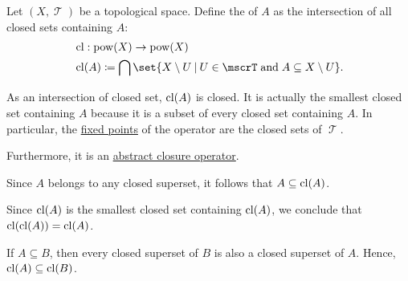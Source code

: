 \begin{definition}\label{def:topological_closure_operator}
  Let \( (X, \mscrT) \) be a topological space. Define the  of \( A \) as the intersection of all closed sets containing \( A \):
  \begin{equation*}
    \begin{aligned}
      &\cl: \pow(X) \to \pow(X) \\
      &\cl(A) \coloneqq \bigcap \set{ X \setminus U \given U \in \mscrT \T{and} A \subseteq X \setminus U }.
    \end{aligned}
  \end{equation*}

  As an intersection of closed set, \( \operatorname{cl}(A) \) is closed. It is actually the smallest closed set containing \( A \) because it is a subset of every closed set containing \( A \). In particular, the \hyperref[def:fixed_point]{fixed points} of the operator are the closed sets of \( \mscrT \).

  Furthermore, it is an \hyperref[def:abstract_closure_operator]{abstract closure operator}.
\end{definition}
\begin{defproof}
   Since \( A \) belongs to any closed superset, it follows that \( A \subseteq \operatorname{cl}(A) \).

   Since \( \operatorname{cl}(A) \) is the smallest closed set containing \( \operatorname{cl}(A) \), we conclude that \( \operatorname{cl}(\operatorname{cl}(A)) = \operatorname{cl}(A) \).

   If \( A \subseteq B \), then every closed superset of \( B \) is also a closed superset of \( A \). Hence, \( \operatorname{cl}(A) \subseteq \operatorname{cl}(B) \).
\end{defproof}


